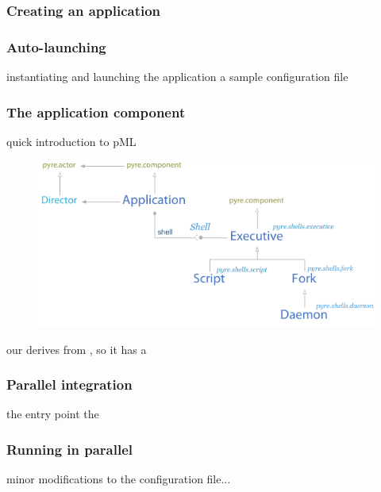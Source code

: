 %
%


\begin{frame}[fragile]
%
  \frametitle{Creating an application}
%
%
\end{frame}

\begin{frame}[fragile]
%
  \frametitle{Auto-launching}
%
  instantiating and launching the application
%
%
  a sample configuration file
%
%
\end{frame}

\begin{frame}[fragile]
%
  \frametitle{The application component}
%
  quick introduction to pML 
%
  \begin{figure}
    \includegraphics[scale=1.0]{figures/pyre-shells.pdf}
  \end{figure}
%
  our  derives from , so it has a 
%
\end{frame}

\begin{frame}[fragile]
%
  \frametitle{Parallel integration}
%
  the  entry point
%
%
  the 
%
\end{frame}

\begin{frame}[fragile]
%
  \frametitle{Running in parallel}
%
  minor modifications to the configuration file...
%
%
\end{frame}

